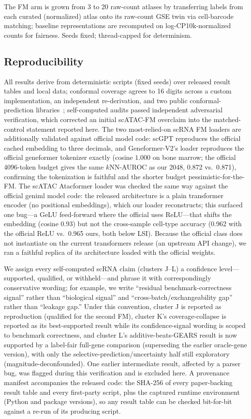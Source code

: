 \documentclass[11pt]{article}
\begin{document}
The FM arm is grown from 3 to 20 raw-count atlases by transferring labels from each curated (normalized) atlas onto its raw-count GSE twin via cell-barcode matching; baseline representations are recomputed on log-CP10k-normalized counts for fairness. Seeds fixed; thread-capped for determinism.

\subsection{Reproducibility}\label{sec:repro}
All results derive from deterministic scripts (fixed seeds) over released result tables and local data; conformal coverage agrees to 16 digits across a custom implementation, an independent re-derivation, and two public conformal-prediction libraries~\cite{crepes,mapie}; self-computed audits passed independent adversarial verification, which corrected an initial scATAC-FM overclaim into the matched-control statement reported here. The two most-relied-on scRNA FM loaders are additionally validated against official model code: scGPT reproduces the official cached embedding to three decimals, and Geneformer-V2's loader reproduces the official geneformer tokenizer exactly (cosine $1.000$ on bone marrow; the official 4096-token budget gives the same $k$NN-AUROC as our 2048, 0.872 vs.\ 0.871), confirming the tokenization is faithful and the shorter budget pessimistic-for-the-FM. The scATAC Atacformer loader was checked the same way against the official geniml model code: the released architecture is a plain transformer encoder (no positional embeddings), which our loader reconstructs; this surfaced one bug---a GeLU feed-forward where the official uses ReLU---that shifts the embedding (cosine 0.93) but not the cross-sample cell-type accuracy (0.962 with the official ReLU vs.\ 0.965 ours, both below LSI). Because the official class does not instantiate on the current transformers release (an upstream API change), we ran a faithful replica of its architecture loaded with the official weights.

We assign every self-computed scRNA claim (clusters J--L) a confidence level---supported, qualified, or withheld---and phrase it with correspondingly conservative wording; for example, we write ``residual benchmark-correctness signal'' rather than ``biological signal'' and ``cross-batch/exchangeability gap'' rather than ``leakage gap.'' Under this convention, cluster J is reported as reproduction (qualified for the second FM), cluster K's coverage-collapse is reported as its best-supported result while its confidence-signal wording is scoped to benchmark correctness, and cluster L's additive-beats-GEARS result is now supported by a label-fair full-gene comparison (superseding the earlier oracle-gene version), with only the selective-prediction/uncertainty half still exploratory (magnitude-deconfounded). One earlier intermediate result, affected by a parser bug, was flagged during this verification and is excluded here. A provenance manifest accompanies the released code: the SHA-256 of every paper-backing result table and every first-party script, plus the captured runtime environment (Python and package versions), so any result table can be checked bit-for-bit against a re-run of its producing script.
\end{document}
